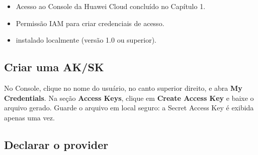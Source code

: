 \documentclass[portuguese]{guide}
\begin{document}
\begin{objectives}

  \prerequisites
  \begin{itemize}
    \item Acesso ao Console da Huawei Cloud concluído no Capítulo 1.
    \item Permissão IAM para criar credenciais de acesso.
    \item {} instalado localmente (versão 1.0 ou superior).
  \end{itemize}
\end{objectives}

\subsection{Criar uma AK/SK}


No Console, clique no nome do usuário, no canto superior direito, e abra
\textbf{My Credentials}. Na seção \textbf{Access Keys}, clique em
\textbf{Create Access Key} e baixe o arquivo gerado. Guarde o arquivo em local
seguro: a Secret Access Key é exibida apenas uma vez.

\subsection{Declarar o provider}
\end{document}
